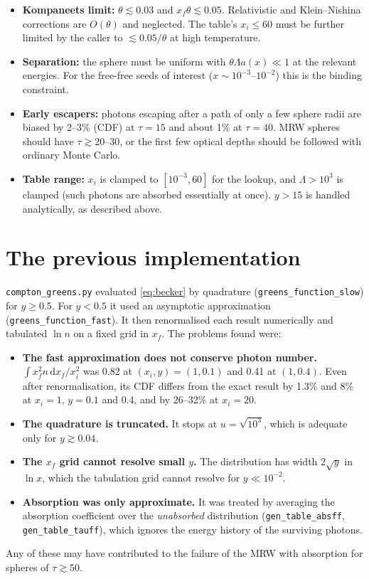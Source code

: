 \documentclass[11pt]{article}
\newcommand{\dd}{\mathrm{d}}
\begin{document}
\begin{itemize}
\item \textbf{Kompaneets limit:} $\theta\lesssim0.03$ and
  $x_f\theta\lesssim0.05$. Relativistic and Klein--Nishina corrections are
  $O(\theta)$ and neglected. The table's $x_i\le60$ must be further limited
  by the caller to $\lesssim0.05/\theta$ at high temperature.
\item \textbf{Separation:} the sphere must be uniform with
  $\theta\Lambda a(x)\ll1$ at the relevant energies. For the free-free seeds
  of interest ($x\sim10^{-3}$--$10^{-2}$) this is the binding constraint.
\item \textbf{Early escapers:} photons escaping after a path of only a few
  sphere radii are biased by 2--3\% (CDF) at $\tau=15$ and about 1\% at
  $\tau=40$. MRW spheres should have $\tau\gtrsim20$--30, or the first few
  optical depths should be followed with ordinary Monte Carlo.
\item \textbf{Table range:} $x_i$ is clamped to $[10^{-3},60]$ for the lookup,
  and $\Lambda>10^3$ is clamped (such photons are absorbed essentially at
  once). $y>15$ is handled analytically, as described above.
\end{itemize}

\section{The previous implementation}\label{sec:old}

\texttt{compton\_greens.py} evaluated \eqref{eq:becker} by quadrature
(\texttt{greens\_function\_slow}) for $y\ge0.5$. For $y<0.5$ it used an
asymptotic approximation (\texttt{greens\_function\_fast}). It then
renormalised each result numerically and tabulated $\ln n$ on a fixed grid
in $x_f$. The problems found were:
\begin{itemize}
\item \textbf{The fast approximation does not conserve photon number.}
  $\int x_f^2n\,\dd x_f/x_i^2$ was 0.82 at $(x_i,y)=(1,0.1)$ and 0.41 at
  $(1,0.4)$. Even after renormalisation, its CDF differs from the exact
  result by 1.3\% and 8\% at $x_i=1$, $y=0.1$ and 0.4, and by 26--32\% at
  $x_i=20$.
\item \textbf{The quadrature is truncated.} It stops at $u=\sqrt{10^3}$, which
  is adequate only for $y\gtrsim0.04$.
\item \textbf{The $x_f$ grid cannot resolve small $y$.} The distribution has
  width $2\sqrt y$ in $\ln x$, which the tabulation grid cannot resolve for
  $y\ll10^{-2}$.
\item \textbf{Absorption was only approximate.} It was treated by averaging
  the absorption coefficient over the \emph{unabsorbed} distribution
  (\texttt{gen\_table\_absff}, \texttt{gen\_table\_tauff}), which ignores the
  energy history of the surviving photons.
\end{itemize}
Any of these may have contributed to the failure of the MRW with absorption
for spheres of $\tau\gtrsim50$.
\end{document}
